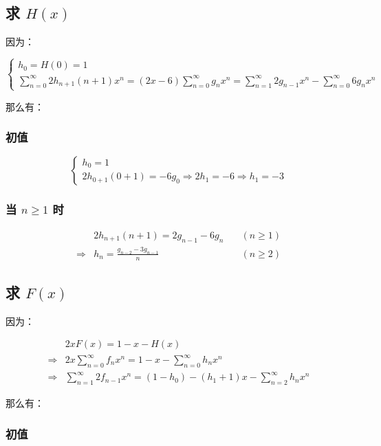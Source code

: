 \documentclass[UTF8]{article}
\begin{document}
\subsection{求 $H(x)$}

因为：

$$
\begin{cases}
    h_0=H(0)=1 \\
    \sum_{n=0}^{\infty}2h_{n+1}(n+1)x^n=(2x-6)\sum_{n=0}^{\infty}g_nx^n=\sum_{n=1}^{\infty}2g_{n-1}x^n-\sum_{n=0}^{\infty}6g_nx^n
\end{cases}
$$

那么有：

\subsubsection{初值}

$$
\begin{cases}
    h_0=1 \\
    2h_{0+1}(0+1)=-6g_0 \Rightarrow 2h_1=-6 \Rightarrow h_1=-3
\end{cases}
$$

\subsubsection{当 $n \ge 1$ 时}

$$
\begin{aligned}
    &2h_{n+1}(n+1)=2g_{n-1}-6g_n \quad & (n \ge 1)\\
    \Rightarrow &h_n=\frac{g_{n-2}-3g_{n-1}}{n}  \quad & (n \ge 2)
\end{aligned}
$$

\subsection{求 $F(x)$}

因为：

$$
\begin{aligned}
    &2xF(x)=1-x-H(x) \\
    \Rightarrow &2x\sum_{n=0}^{\infty}f_nx^n=1-x-\sum_{n=0}^{\infty}h_nx^n \\
    \Rightarrow &\sum_{n=1}^{\infty} 2f_{n-1}x^{n}=(1-h_0)-(h_1+1)x-\sum_{n=2}^{\infty}h_nx^n
\end{aligned}
$$

那么有：

\subsubsection{初值}
\end{document}
